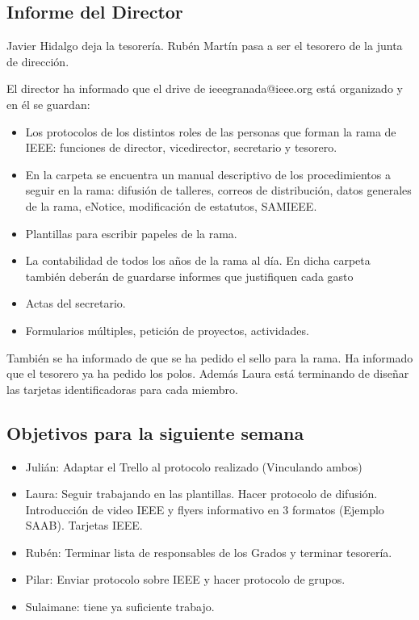\documentclass[12pt,twoside,openany,a4paper]{book}
\begin{document}
    \subsection{Informe del Director}
    Javier Hidalgo deja la tesorería. Rubén Martín pasa a ser el tesorero de la junta de dirección.

    El director ha informado que el drive de ieeegranada@ieee.org está organizado y en él se guardan:
    \begin{itemize}
        \item Los protocolos de los distintos roles de las personas que forman la rama de IEEE: funciones de director, vicedirector, secretario y tesorero.
        \item En la carpeta se encuentra un manual descriptivo de los procedimientos a seguir en la rama: difusión de talleres, correos de distribución, datos generales de la rama, eNotice, modificación de estatutos, SAMIEEE.
        \item Plantillas para escribir papeles de la rama.
        \item La contabilidad de todos los años de la rama al día. En dicha carpeta también deberán de guardarse informes que justifiquen cada gasto
        \item Actas del secretario.
        \item Formularios múltiples, petición de proyectos, actividades.
    \end{itemize}

    También se ha informado de que se ha pedido el sello para la rama. Ha informado que el tesorero ya ha pedido los polos. Además Laura está terminando de diseñar las tarjetas identificadoras para cada miembro.

    \subsection{Objetivos para la siguiente semana}
    \begin{itemize}
        \item Julián: Adaptar el Trello al protocolo realizado (Vinculando ambos)
        \item Laura: Seguir trabajando en las plantillas. Hacer protocolo de difusión. Introducción de video IEEE y flyers informativo en 3 formatos (Ejemplo SAAB). Tarjetas IEEE.
        \item Rubén: Terminar lista de responsables de los Grados y terminar tesorería.
        \item Pilar: Enviar protocolo sobre IEEE y hacer protocolo de grupos.
        \item Sulaimane: tiene ya suficiente trabajo.
    \end{itemize}
\end{document}

